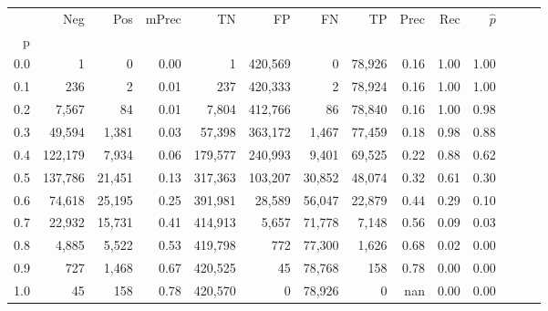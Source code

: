 \begin{tabular}{rrrrrrrrrrrrrr}
\toprule
{} &      Neg &     Pos & mPrec &       TN &       FP &      FN &      TP &  Prec &   Rec & $\hat{p}$ \\
p   &          &         &       &          &          &         &         &       &       &           \\
\midrule
0.0 &        1 &       0 &  0.00 &        1 &  420,569 &       0 &  78,926 &  0.16 &  1.00 &      1.00 \\
0.1 &      236 &       2 &  0.01 &      237 &  420,333 &       2 &  78,924 &  0.16 &  1.00 &      1.00 \\
0.2 &    7,567 &      84 &  0.01 &    7,804 &  412,766 &      86 &  78,840 &  0.16 &  1.00 &      0.98 \\
0.3 &   49,594 &   1,381 &  0.03 &   57,398 &  363,172 &   1,467 &  77,459 &  0.18 &  0.98 &      0.88 \\
0.4 &  122,179 &   7,934 &  0.06 &  179,577 &  240,993 &   9,401 &  69,525 &  0.22 &  0.88 &      0.62 \\
0.5 &  137,786 &  21,451 &  0.13 &  317,363 &  103,207 &  30,852 &  48,074 &  0.32 &  0.61 &      0.30 \\
0.6 &   74,618 &  25,195 &  0.25 &  391,981 &   28,589 &  56,047 &  22,879 &  0.44 &  0.29 &      0.10 \\
0.7 &   22,932 &  15,731 &  0.41 &  414,913 &    5,657 &  71,778 &   7,148 &  0.56 &  0.09 &      0.03 \\
0.8 &    4,885 &   5,522 &  0.53 &  419,798 &      772 &  77,300 &   1,626 &  0.68 &  0.02 &      0.00 \\
0.9 &      727 &   1,468 &  0.67 &  420,525 &       45 &  78,768 &     158 &  0.78 &  0.00 &      0.00 \\
1.0 &       45 &     158 &  0.78 &  420,570 &        0 &  78,926 &       0 &   nan &  0.00 &      0.00 \\
\bottomrule
\end{tabular}

